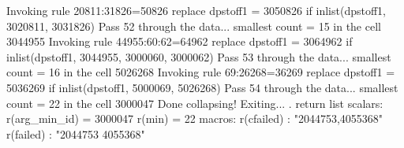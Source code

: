   Invoking rule 20811:31826=50826
  replace dpstoff1 = 3050826 if inlist(dpstoff1, 3020811, 3031826)
Pass 52 through the data...
  smallest count = 15 in the cell      3044955
  Invoking rule 44955:60:62=64962
  replace dpstoff1 = 3064962 if inlist(dpstoff1, 3044955, 3000060, 3000062)
Pass 53 through the data...
  smallest count = 16 in the cell      5026268
  Invoking rule 69:26268=36269
  replace dpstoff1 = 5036269 if inlist(dpstoff1, 5000069, 5026268)
Pass 54 through the data...
  smallest count = 22 in the cell      3000047
  Done collapsing! Exiting...
{\smallskip}
. return list
{\smallskip}
scalars:
         r(arg_min_id) =  3000047
                r(min) =  22
{\smallskip}
macros:
            r(cfailed) : "2044753,4055368"
             r(failed) : "2044753 4055368"
